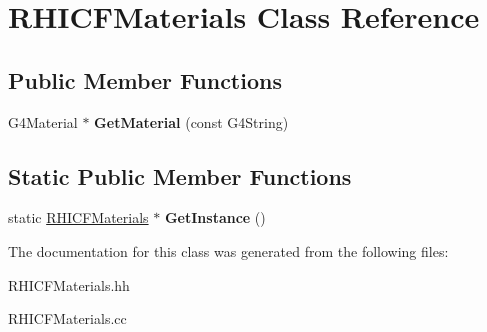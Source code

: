 \hypertarget{class_r_h_i_c_f_materials}{}\section{R\+H\+I\+C\+F\+Materials Class Reference}
\label{class_r_h_i_c_f_materials}
\subsection*{Public Member Functions}
\begin{DoxyCompactItemize}
\item 
\hypertarget{class_r_h_i_c_f_materials_acd28f3e73d2a00df6d8f0ced12ec4ef2}{}G4\+Material $\ast$ {\bfseries Get\+Material} (const G4\+String)\label{class_r_h_i_c_f_materials_acd28f3e73d2a00df6d8f0ced12ec4ef2}

\end{DoxyCompactItemize}
\subsection*{Static Public Member Functions}
\begin{DoxyCompactItemize}
\item 
\hypertarget{class_r_h_i_c_f_materials_abfd60afadb7808fe5f8cf6ea64a7fd85}{}static \hyperlink{class_r_h_i_c_f_materials}{R\+H\+I\+C\+F\+Materials} $\ast$ {\bfseries Get\+Instance} ()\label{class_r_h_i_c_f_materials_abfd60afadb7808fe5f8cf6ea64a7fd85}

\end{DoxyCompactItemize}


The documentation for this class was generated from the following files\+:\begin{DoxyCompactItemize}
\item 
R\+H\+I\+C\+F\+Materials.\+hh\item 
R\+H\+I\+C\+F\+Materials.\+cc\end{DoxyCompactItemize}
